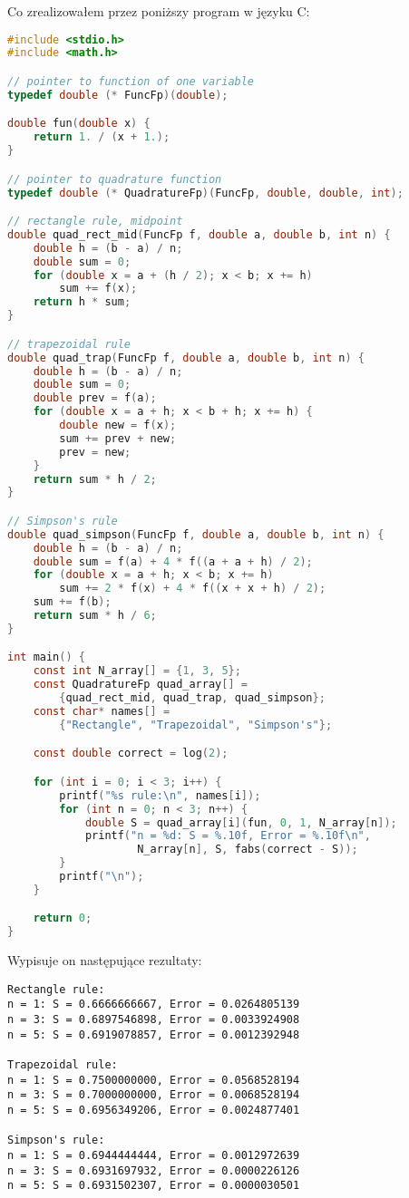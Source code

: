 \documentclass{article}
\begin{document}
\noindent
Co zrealizowałem przez poniższy program w języku C:

\begin{lstlisting}[language=C]
#include <stdio.h>
#include <math.h>

// pointer to function of one variable
typedef double (* FuncFp)(double);

double fun(double x) {
    return 1. / (x + 1.);
}

// pointer to quadrature function
typedef double (* QuadratureFp)(FuncFp, double, double, int);

// rectangle rule, midpoint
double quad_rect_mid(FuncFp f, double a, double b, int n) {
    double h = (b - a) / n;
    double sum = 0;
    for (double x = a + (h / 2); x < b; x += h)
        sum += f(x);
    return h * sum;
}

// trapezoidal rule
double quad_trap(FuncFp f, double a, double b, int n) {
    double h = (b - a) / n;
    double sum = 0;
    double prev = f(a);
    for (double x = a + h; x < b + h; x += h) {
        double new = f(x);
        sum += prev + new;
        prev = new;
    }
    return sum * h / 2;
}

// Simpson's rule
double quad_simpson(FuncFp f, double a, double b, int n) {
    double h = (b - a) / n;
    double sum = f(a) + 4 * f((a + a + h) / 2);
    for (double x = a + h; x < b; x += h)
        sum += 2 * f(x) + 4 * f((x + x + h) / 2);
    sum += f(b);
    return sum * h / 6;
}

int main() {
    const int N_array[] = {1, 3, 5};
    const QuadratureFp quad_array[] =
        {quad_rect_mid, quad_trap, quad_simpson};
    const char* names[] =
        {"Rectangle", "Trapezoidal", "Simpson's"};

    const double correct = log(2);

    for (int i = 0; i < 3; i++) {
        printf("%s rule:\n", names[i]);
        for (int n = 0; n < 3; n++) {
            double S = quad_array[i](fun, 0, 1, N_array[n]);
            printf("n = %d: S = %.10f, Error = %.10f\n",
                    N_array[n], S, fabs(correct - S));
        }
        printf("\n");
    }

    return 0;
}
\end{lstlisting}

\noindent
Wypisuje on następujące rezultaty:

\begin{verbatim}
Rectangle rule:
n = 1: S = 0.6666666667, Error = 0.0264805139
n = 3: S = 0.6897546898, Error = 0.0033924908
n = 5: S = 0.6919078857, Error = 0.0012392948

Trapezoidal rule:
n = 1: S = 0.7500000000, Error = 0.0568528194
n = 3: S = 0.7000000000, Error = 0.0068528194
n = 5: S = 0.6956349206, Error = 0.0024877401

Simpson's rule:
n = 1: S = 0.6944444444, Error = 0.0012972639
n = 3: S = 0.6931697932, Error = 0.0000226126
n = 5: S = 0.6931502307, Error = 0.0000030501
\end{verbatim}
\end{document}
